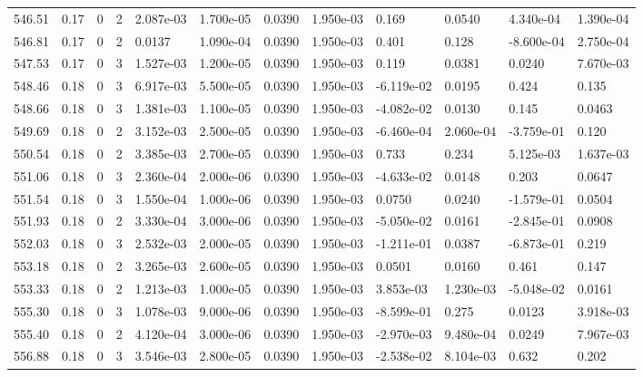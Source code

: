 \documentclass[preview]{standalone}
\begin{document}
{{{{{{{{{{{{{{{{{\begin{tabular}{L{1.2cm}C{1.2cm} C{0.3cm}C{0.5cm} C{1.4cm}C{1.4cm} C{1.4cm}C{1.4cm} C{1.6cm}C{1.6cm} C{1.6cm}C{1.6cm}}
  546.51  &  0.17  & 0     &  2 &  2.087e-03  & 1.700e-05  &  0.0390&   1.950e-03& 0.169 & 0.0540   &  4.340e-04 & 1.390e-04  \\ 
  546.81  &  0.17  & 0     &  2 &  0.0137  & 1.090e-04  &  0.0390&   1.950e-03& 0.401 & 0.128   &  -8.600e-04 & 2.750e-04  \\ 
  547.53  &  0.17  & 0     &  3 &  1.527e-03  & 1.200e-05  &  0.0390&   1.950e-03& 0.119 & 0.0381   &  0.0240 & 7.670e-03  \\ 
  548.46  &  0.18  & 0     &  3 &  6.917e-03  & 5.500e-05  &  0.0390&   1.950e-03& -6.119e-02 & 0.0195   &  0.424 & 0.135  \\ 
  548.66  &  0.18  & 0     &  3 &  1.381e-03  & 1.100e-05  &  0.0390&   1.950e-03& -4.082e-02 & 0.0130   &  0.145 & 0.0463  \\ 
  549.69  &  0.18  & 0     &  2 &  3.152e-03  & 2.500e-05  &  0.0390&   1.950e-03& -6.460e-04 & 2.060e-04   &  -3.759e-01 & 0.120  \\ 
  550.54  &  0.18  & 0     &  2 &  3.385e-03  & 2.700e-05  &  0.0390&   1.950e-03& 0.733 & 0.234   &  5.125e-03 & 1.637e-03  \\ 
  551.06  &  0.18  & 0     &  3 &  2.360e-04  & 2.000e-06  &  0.0390&   1.950e-03& -4.633e-02 & 0.0148   &  0.203 & 0.0647  \\ 
  551.54  &  0.18  & 0     &  3 &  1.550e-04  & 1.000e-06  &  0.0390&   1.950e-03& 0.0750 & 0.0240   &  -1.579e-01 & 0.0504  \\ 
  551.93  &  0.18  & 0     &  2 &  3.330e-04  & 3.000e-06  &  0.0390&   1.950e-03& -5.050e-02 & 0.0161   &  -2.845e-01 & 0.0908  \\ 
  552.03  &  0.18  & 0     &  3 &  2.532e-03  & 2.000e-05  &  0.0390&   1.950e-03& -1.211e-01 & 0.0387   &  -6.873e-01 & 0.219  \\ 
  553.18  &  0.18  & 0     &  2 &  3.265e-03  & 2.600e-05  &  0.0390&   1.950e-03& 0.0501 & 0.0160   &  0.461 & 0.147  \\ 
  553.33  &  0.18  & 0     &  2 &  1.213e-03  & 1.000e-05  &  0.0390&   1.950e-03& 3.853e-03 & 1.230e-03   &  -5.048e-02 & 0.0161  \\ 
  555.30  &  0.18  & 0     &  3 &  1.078e-03  & 9.000e-06  &  0.0390&   1.950e-03& -8.599e-01 & 0.275   &  0.0123 & 3.918e-03  \\ 
  555.40  &  0.18  & 0     &  2 &  4.120e-04  & 3.000e-06  &  0.0390&   1.950e-03& -2.970e-03 & 9.480e-04   &  0.0249 & 7.967e-03  \\ 
  556.88  &  0.18  & 0     &  3 &  3.546e-03  & 2.800e-05  &  0.0390&   1.950e-03& -2.538e-02 & 8.104e-03   &  0.632 & 0.202  \\ 

\end{tabular}}}}}}}}}}}}}}}}}}
\end{document}
